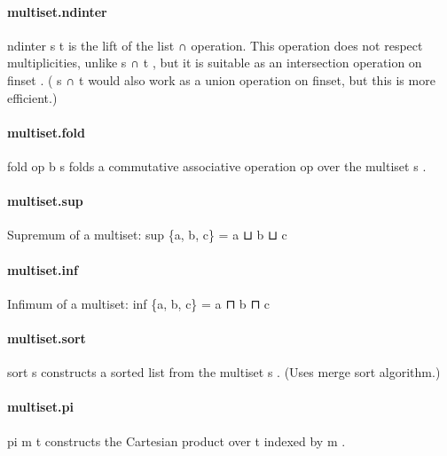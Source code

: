 \documentclass{article}
\begin{document}
\paragraph{multiset.ndinter}
\par
\colorbox[RGB]{253,246,227}{{{{\color[RGB]{101, 123, 131} ndinter s t }}}} is the lift of the list 
\colorbox[RGB]{253,246,227}{{{{\color[RGB]{101, 123, 131} ∩ }}}} operation. This operation
does not respect multiplicities, unlike 
\colorbox[RGB]{253,246,227}{{{{\color[RGB]{101, 123, 131} s ∩ t }}}}, but it is suitable as
an intersection operation on 
\colorbox[RGB]{253,246,227}{{{{\color[RGB]{101, 123, 131} finset }}}}. (
\colorbox[RGB]{253,246,227}{{{{\color[RGB]{101, 123, 131} s ∩ t }}}} would also work as a union operation
on finset, but this is more efficient.)
\paragraph{multiset.fold}
\par
\colorbox[RGB]{253,246,227}{{{{\color[RGB]{101, 123, 131} fold op b s }}}} folds a commutative associative operation 
\colorbox[RGB]{253,246,227}{{{{\color[RGB]{101, 123, 131} op }}}} over
the multiset 
\colorbox[RGB]{253,246,227}{{{{\color[RGB]{101, 123, 131} s }}}}.
\paragraph{multiset.sup}
\par
Supremum of a multiset: 
\colorbox[RGB]{253,246,227}{{{{\color[RGB]{101, 123, 131} sup \{a, b, c\}  }}}{{{\color[RGB]{181, 137, 0} = }}}{{{\color[RGB]{101, 123, 131}  a ⊔ b ⊔ c }}}}\paragraph{multiset.inf}
\par
Infimum of a multiset: 
\colorbox[RGB]{253,246,227}{{{{\color[RGB]{101, 123, 131} inf \{a, b, c\}  }}}{{{\color[RGB]{181, 137, 0} = }}}{{{\color[RGB]{101, 123, 131}  a ⊓ b ⊓ c }}}}\paragraph{multiset.sort}
\par
\colorbox[RGB]{253,246,227}{{{{\color[RGB]{101, 123, 131} sort s }}}} constructs a sorted list from the multiset 
\colorbox[RGB]{253,246,227}{{{{\color[RGB]{101, 123, 131} s }}}}.
(Uses merge sort algorithm.)
\paragraph{multiset.pi}
\par
\colorbox[RGB]{253,246,227}{{{{\color[RGB]{101, 123, 131} pi m t }}}} constructs the Cartesian product over 
\colorbox[RGB]{253,246,227}{{{{\color[RGB]{101, 123, 131} t }}}} indexed by 
\colorbox[RGB]{253,246,227}{{{{\color[RGB]{101, 123, 131} m }}}}.
\end{document}
